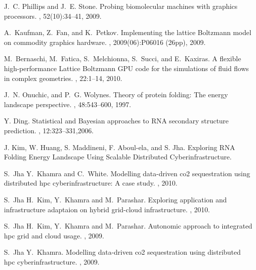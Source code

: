\begin{thebibliography}{10}
J.~C. Phillips and J.~E. Stone.
\newblock Probing biomolecular machines with graphics processors.
, 52(10):34--41, 2009.

A.~Kaufman, Z.~Fan, and K.~Petkov.
\newblock Implementing the lattice {Boltzmann} model on commodity graphics
  hardware.
,
  2009(06):P06016 (26pp), 2009.

M.~Bernaschi, M.~Fatica, S.~Melchionna, S.~Succi, and E.~Kaxiras.
\newblock A flexible high-performance {Lattice Boltzmann GPU} code for the
  simulations of fluid flows in complex geometries.
, 22:1--14, 2010.

J.~N. Onuchic, and P.~G. Wolynes.
\newblock Theory of protein folding: The energy landscape perspective.
, 48:543--600, 1997.

Y. Ding.
\newblock Statistical and Bayesian approaches to RNA secondary structure prediction.
, 12:323--331,2006.

J. Kim, W. Huang, S. Maddineni, F. Aboul-ela, and S. Jha.
\newblock Exploring RNA Folding Energy Landscape Using Scalable Distributed Cyberinfrastructure.


S.~Jha Y.~Khamra and C.~White.
\newblock Modelling data-driven co2 sequestration using distributed hpc
  cyberinfrastructure: A case study.
, 2010.

S.~Jha H.~Kim, Y.~Khamra and M.~Parashar.
\newblock Exploring application and infrastructure adaptaion on hybrid
  grid-cloud infrastructure.
, 2010.

S.~Jha H.~Kim, Y.~Khamra and M.~Parashar.
\newblock Autonomic approach to integrated hpc grid and cloud usage.
, 2009.

S.~Jha Y.~Khamra.
\newblock Modelling data-driven co2 sequestration using distributed hpc
  cyberinfrastructure.
, 2009.


\end{thebibliography}

